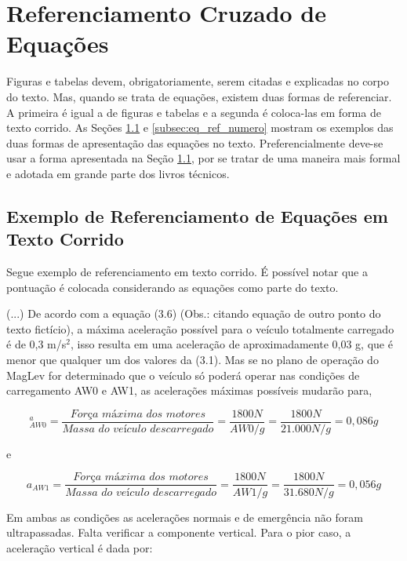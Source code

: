 \documentclass[
        oneside,      %
        english,			
        brazil			 
        ]{configcefetmglpd}
\begin{document}
\section{Referenciamento Cruzado de Equações}
Figuras e tabelas devem, obrigatoriamente, serem citadas e explicadas no corpo do texto. Mas, quando se trata de equações, existem duas formas de referenciar. A primeira é igual a de figuras e tabelas e a segunda é coloca-las em forma de texto corrido. As Seções \ref{subsec:refer_eq_texto_corrido} e \ref{subsec:eq_ref_numero} mostram os exemplos das duas formas de apresentação das equações no texto. Preferencialmente deve-se usar a forma apresentada na Seção \ref{subsec:refer_eq_texto_corrido}, por se tratar de uma maneira mais formal e adotada em grande parte dos livros técnicos.

\subsection{Exemplo de Referenciamento de Equações em Texto Corrido} \label{subsec:refer_eq_texto_corrido}
Segue exemplo de referenciamento em texto corrido. É possível notar que a pontuação é colocada considerando as equações como parte do texto.

(...) De acordo com a equação (3.6) (Obs.: citando equação de outro ponto do texto fictício), a máxima aceleração possível para o veículo totalmente carregado é de 0,3 m/s$^2$, isso resulta em uma aceleração de aproximadamente 0,03 g, que é menor que qualquer um dos valores da (3.1). Mas se no plano de operação do MagLev for determinado que o veículo só poderá operar nas condições de carregamento AW0 e AW1, as acelerações máximas possíveis mudarão para,

\begin{equation}
	\label{eq:Aw0}
^	a_{AW0} = \frac{\textit{Força~máxima~dos~motores}}{\textit{Massa~do~veículo~descarregado}} = \frac{1800N}{AW0/g}
	=\frac{1800N}{21.000N/g}=0,086g
\end{equation}

e

\begin{equation}
	\label{eq:Aw1}
	a_{AW1} = \frac{\textit{Força~máxima~dos~motores}}{\textit{Massa~do~veículo~descarregado}} = \frac{1800N}{AW1/g}
	=\frac{1800N}{31.680N/g}=0,056g
\end{equation}

Em ambas as condições as acelerações normais e de emergência não foram ultrapassadas. Falta verificar a componente vertical. Para o pior caso, a aceleração vertical é dada por:
\end{document}
